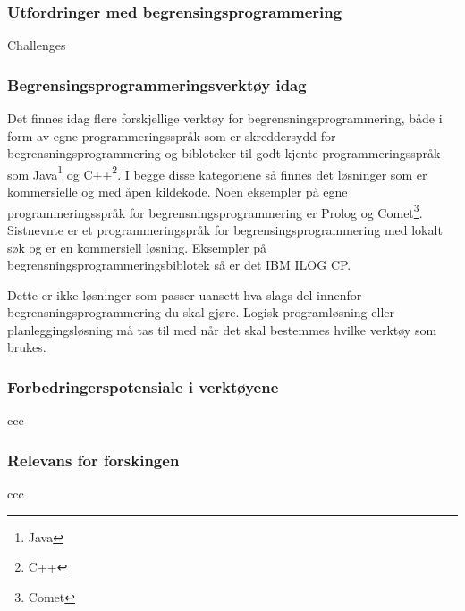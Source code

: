 \subsubsection{Utfordringer med begrensingsprogrammering}
Challenges

\subsubsection{Begrensingsprogrammeringsverktøy idag}
Det finnes idag flere forskjellige verktøy for begrensningsprogrammering, både i form av egne programmeringsspråk som er skreddersydd for begrensningsprogrammering og bibloteker til godt kjente programmeringsspråk som Java\footnote{Java} og C++\footnote{C++}. I begge disse kategoriene så finnes det løsninger som er kommersielle og med åpen kildekode. Noen eksempler på egne programmeringsspråk for begrensningsprogrammering er Prolog og Comet\footnote{Comet}. Sistnevnte er et programmeringspråk for begrensingsprogrammering med lokalt søk og er en kommersiell løsning. Eksempler på begrensningsprogrammeringsbiblotek så er det IBM ILOG CP.

Dette er ikke løsninger som passer uansett hva slags del innenfor begrensningsprogrammering du skal gjøre. Logisk programløsning eller planleggingsløsning må tas til med når det skal bestemmes hvilke verktøy som brukes.

\subsubsection{Forbedringerspotensiale i verktøyene}
ccc

\subsubsection{Relevans for forskingen}
ccc
